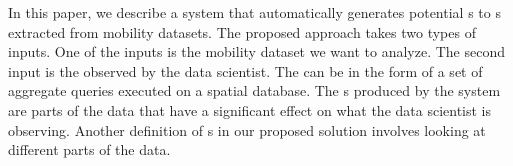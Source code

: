 In this paper, we describe a system that automatically generates potential {\explanation}s to {\fact}s extracted from mobility datasets. The proposed approach takes two types of inputs. One of the inputs is the mobility dataset we want to analyze. The second input is the {\fact} observed by the data scientist. The {\fact} can be in the form of a set of aggregate queries executed on a spatial database. 
The {\explanation}s produced by the system are parts of the data that have a significant effect on what the {\fact} data scientist is observing. %
Another definition of {\explanation}s in our proposed solution involves looking at different parts of the data. 


